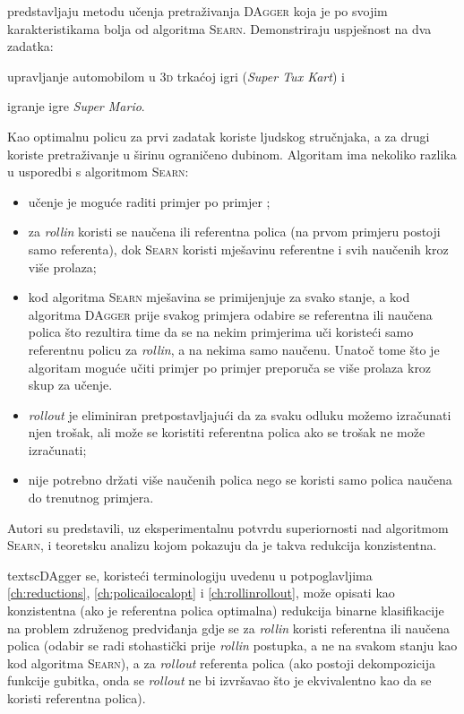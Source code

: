 \citet{ross2011reduction} predstavljaju metodu učenja pretraživanja
\textsc{DAgger}  koja je po svojim
karakteristikama bolja od algoritma \textsc{Searn}. Demonstriraju uspješnost na
dva zadatka:
\begin{inlinelist}
  \item upravljanje automobilom u \textsc{3d} trkaćoj igri (\textit{Super Tux
  Kart}) i
  \item igranje igre \textit{Super Mario}.
\end{inlinelist}
Kao optimalnu policu za prvi zadatak koriste ljudskog stručnjaka, a za drugi
koriste pretraživanje u širinu  ograničeno
dubinom. Algoritam ima nekoliko razlika u usporedbi s algoritmom \textsc{Searn}:
\begin{itemize}
  \item učenje je moguće raditi primjer po primjer ;
  \item za \textit{rollin} koristi se naučena ili referentna polica (na prvom
  primjeru postoji samo referenta), dok \textsc{Searn} koristi mješavinu
  referentne i svih naučenih kroz više prolaza;
  \item kod algoritma \textsc{Searn} mješavina se primijenjuje za svako stanje,
  a kod algoritma \textsc{DAgger} prije svakog primjera odabire se referentna
  ili naučena polica što rezultira time da se na nekim primjerima uči koristeći
  samo referentnu policu za \textit{rollin}, a na nekima samo naučenu. Unatoč
  tome što je algoritam moguće učiti primjer po primjer preporuča se više
  prolaza kroz skup za učenje.
  \item \textit{rollout} je eliminiran pretpostavljajući da za svaku odluku
  možemo izračunati njen trošak, ali može se koristiti referentna polica ako se
  trošak ne može izračunati;
  \item nije potrebno držati više naučenih polica nego se koristi samo polica
  naučena do trenutnog primjera.
\end{itemize}
Autori su predstavili, uz eksperimentalnu potvrdu superiornosti nad algoritmom
\textsc{Searn}, i teoretsku analizu kojom pokazuju da je takva redukcija
konzistentna.

textsc{DAgger} se, koristeći terminologiju uvedenu u potpoglavljima
\ref{ch:reductions}, \ref{ch:policailocalopt} i \ref{ch:rollinrollout}, može
opisati kao konzistentna (ako je referentna polica optimalna) redukcija binarne
klasifikacije na problem združenog predviđanja gdje se za \textit{rollin}
koristi referentna ili naučena polica (odabir se radi stohastički prije
\textit{rollin} postupka, a ne na svakom stanju kao kod algoritma
\textsc{Searn}), a za \textit{rollout} referenta polica (ako postoji
dekompozicija funkcije gubitka, onda se \textit{rollout} ne bi izvršavao što je
ekvivalentno kao da se koristi referentna polica).
